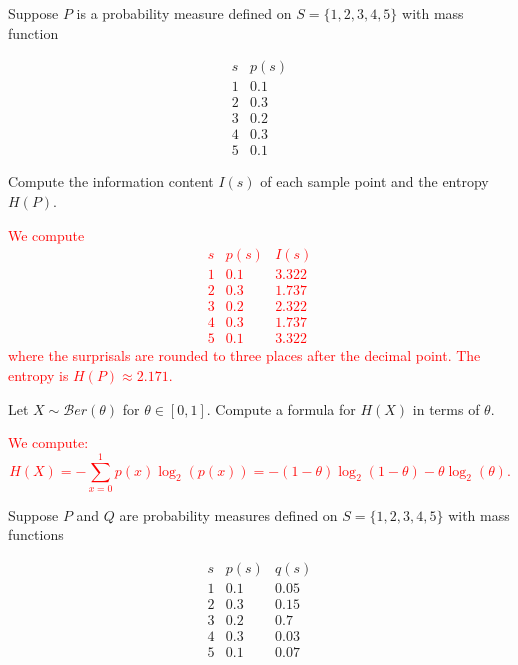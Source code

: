 \documentclass[12pt,reqno]{amsart}
\begin{document}
\bigskip

\prob Suppose $P$ is a probability measure defined on $S = \{1,2,3,4,5\}$ with mass function

	\[
	\begin{array}{c|c}
	s & p(s) \\ \hline
	1 & 0.1 \\
	2 & 0.3 \\
	3 & 0.2 \\
	4 & 0.3 \\
	5 & 0.1 
	\end{array}
	\]

Compute the information content $I(s)$ of each sample point and the entropy $H(P)$.

\bigskip
\textcolor{red}{We compute
	\[
	\begin{array}{c|cc}
	s & p(s) & I(s)\\ \hline
	1 & 0.1 & 3.322\\
	2 & 0.3 & 1.737\\
	3 & 0.2 & 2.322\\
	4 & 0.3 & 1.737\\
	5 & 0.1 & 3.322
	\end{array}
	\]
where the surprisals are rounded to three places after the decimal point. The entropy is $H(P) \approx 2.171$.}
\bigskip









\prob Let $X\sim \mathcal{B}er(\theta)$ for $\theta \in [0,1]$. Compute a formula for $H(X)$ in terms of $\theta$.

\bigskip
\textcolor{red}{We compute:
	\[H(X) = -\sum_{x=0}^1 p(x) \log_2(p(x)) = -(1-\theta) \log_2(1-\theta) - \theta \log_2(\theta).
	\]}
\bigskip









\prob Suppose $P$ and $Q$ are probability measures defined on $S = \{1,2,3,4,5\}$ with mass functions

	\[
	\begin{array}{c|cc}
	s & p(s) & q(s) \\ \hline
	1 & 0.1 & 0.05 \\
	2 & 0.3 & 0.15 \\
	3 & 0.2 & 0.7 \\
	4 & 0.3 & 0.03 \\
	5 & 0.1 & 0.07
	\end{array}
	\]
\end{document}
